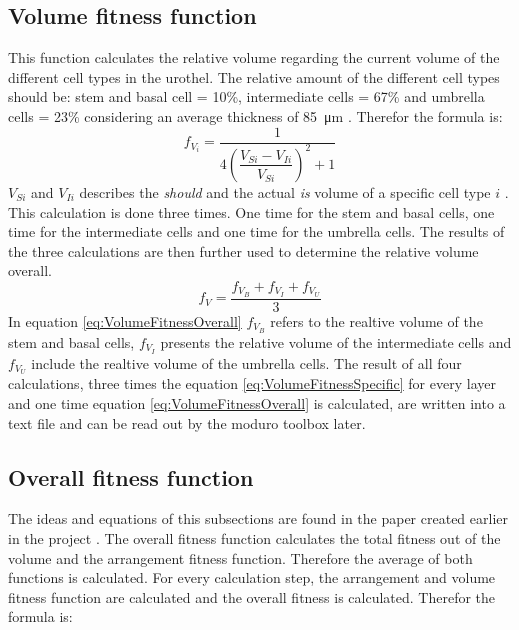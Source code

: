 \subsection{Volume fitness function} \label{subsec:VolumeFitness}
This function calculates the relative volume regarding the current volume of the different cell types in the urothel. The relative amount of the different cell types should be: stem and basal cell = 10\%, intermediate cells = 67\% and umbrella cells = 23\% considering an average thickness of \SI{85}{\micro\metre} \cite{Torelli2017}. Therefor the formula is:
\begin{equation}\label{eq:VolumeFitnessSpecific}
f_{V_{i}} = \dfrac{1}{4 (\dfrac{V_{Si}-V_{Ii}}{V_{Si}})^2 + 1}
\end{equation}
$V_{Si}$ and $V_{Ii}$ describes the \textit{should} and the actual \textit{is} volume of a specific cell type $i$ \cite{Torelli2017}.  This calculation is done three times. One time for the stem and basal cells, one time for the intermediate cells and one time for the umbrella cells. The results of the three calculations are then further used to determine the relative volume overall.
\begin{equation}\label{eq:VolumeFitnessOverall}
f_{V} = \dfrac{f_{V_{B}} + f_{V_{I}} + f_{V_{U}}}{3}
\end{equation}
In equation \ref{eq:VolumeFitnessOverall} $f_{V_{B}}$ refers to the realtive volume of the stem and basal cells, $f_{V_{I}}$ presents the relative volume of the intermediate cells and $f_{V_{U}}$ include the realtive volume of the umbrella cells. \newline
The result of all four calculations, three times the equation \ref{eq:VolumeFitnessSpecific} for every layer and one time equation \ref{eq:VolumeFitnessOverall} is calculated, are written into a text file and can be read out by the moduro toolbox later.

\subsection{Overall fitness function}
The ideas and equations of this subsections are found in the paper created earlier in the project \cite{Torelli2017}. \newline
The overall fitness function calculates the total fitness out of the volume and the arrangement fitness function. Therefore the average of both functions is calculated. For every calculation step, the arrangement and volume fitness function are calculated and the overall fitness is calculated. Therefor the formula is:

